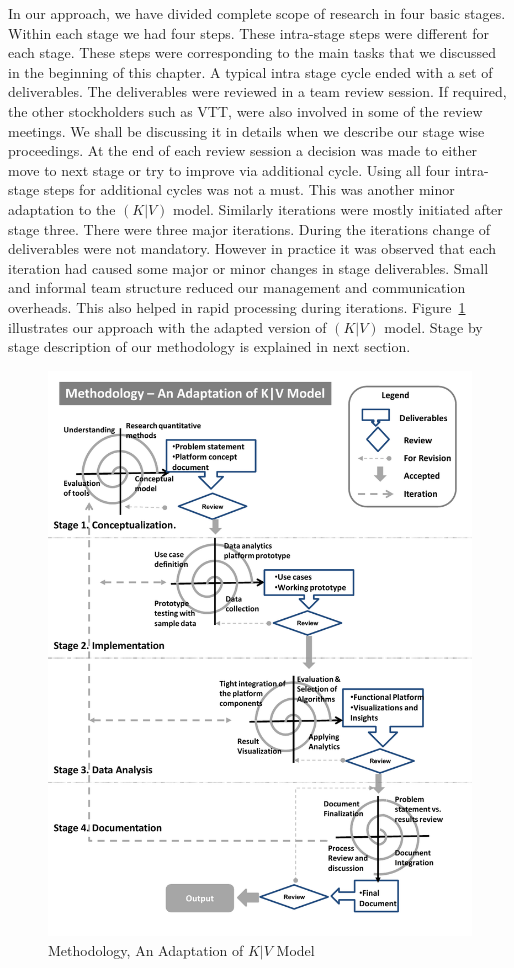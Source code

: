  In our approach, we have divided complete scope of research in four basic stages. Within each stage we had four steps. These intra-stage steps were different for each stage. These steps were corresponding to the main tasks that we discussed in the beginning of this chapter. A typical intra stage cycle ended with a set of deliverables. The deliverables were reviewed in a team review session. If required, the other stockholders such as VTT, were also involved in some of the review meetings. We shall be discussing it in details when we describe our stage wise proceedings. At the end of each review session a decision was made to either move to next stage or try to improve via additional cycle. Using all four intra-stage steps for additional cycles was not a must. This was another minor adaptation to the \((K|V)\) model. Similarly iterations were mostly initiated after stage three. There were three major iterations. During the iterations change of deliverables were not mandatory. However in practice it was observed that each iteration had caused some major or minor changes in stage deliverables. Small and informal team structure reduced our management and communication overheads. This also helped in rapid processing during iterations. Figure~\ref{fig:kv} illustrates our approach with the adapted version of \((K|V)\) model. Stage by stage description of our methodology is explained in next section.   
 \begin{figure}[!h]
   \begin{center}
     \includegraphics[width=\textwidth]{images/kv_method.pdf}
     \caption{Methodology, An Adaptation of \(K|V\) Model}
     \label{fig:kv}
   \end{center}
 \end{figure} 
